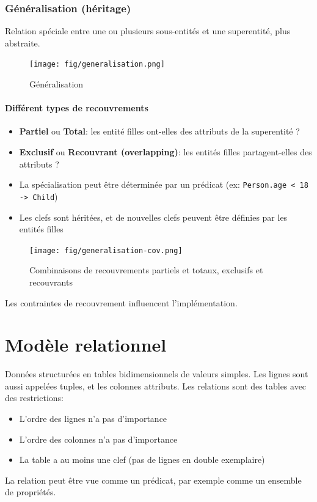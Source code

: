 \documentclass[a4paper]{article}
\begin{document}
\subsubsection{Généralisation (héritage)}
Relation spéciale entre une ou plusieurs sous-entités et une superentité, plus abstraite.

\begin{figure}[H]
    \center
    \texttt{[image: fig/generalisation.png]}
    \caption{Généralisation}
\end{figure}

\paragraph{Différent types de recouvrements}
\begin{itemize}
  \item \textbf{Partiel} ou \textbf{Total}: les entité filles ont-elles des attributs de la superentité ?
  \item \textbf{Exclusif} ou \textbf{Recouvrant (overlapping)}: les entités filles partagent-elles des attributs ?
  \item La spécialisation peut être déterminée par un prédicat (ex: \texttt{Person.age < 18 -> Child})
  \item Les clefs sont héritées, et de nouvelles clefs peuvent être définies par les entités filles
\end{itemize}
\begin{figure}[H]
    \center
    \texttt{[image: fig/generalisation-cov.png]}
    \caption{Combinaisons de recouvrements partiels et totaux, exclusifs et recouvrants}
\end{figure}

Les contraintes de recouvrement influencent l'implémentation.



\section{Modèle relationnel}
Données structurées en tables bidimensionnels de valeurs simples. Les lignes
sont aussi appelées tuples, et les colonnes attributs.
Les relations sont des tables avec des restrictions:
\begin{itemize}
  \item L'ordre des lignes n'a pas d'importance
  \item L'ordre des colonnes n'a pas d'importance
  \item La table a au moins une clef (pas de lignes en double exemplaire)
\end{itemize}
La relation peut être vue comme un prédicat, par exemple comme un ensemble de propriétés.
\end{document}

